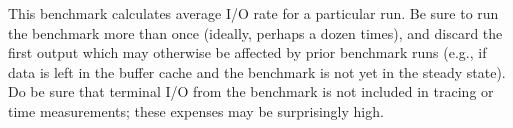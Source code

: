 \documentclass[a4paper,10pt]{article}
\begin{document}
This benchmark calculates average I/O rate for a particular run.
Be sure to run the benchmark more than once (ideally, perhaps a dozen times),
and discard the first output which may otherwise be affected by prior
benchmark runs (e.g., if data is left in the buffer cache and the benchmark is
not yet in the steady state).
Do be sure that terminal I/O from the benchmark is not included in tracing or
time measurements; these expenses may be surprisingly high.



\end{document}

